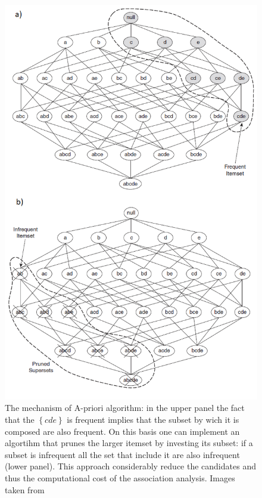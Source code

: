 \documentclass[12pt,%
               a4paper,%
               oneside,openany,%
               titlepage,%
               headinclude,footinclude,%
               BCOR5mm,%
               cleardoublepage=empty,%
               tablecaptionabove,%
               floatperchapter,
               ]{scrreprt}                 %
\begin{document}
\begin{figure}
\begin{center}
\includegraphics[width=\textwidth]{Figures/A-priori-ex.png}
\caption{The mechanism of A-priori algorithm: in the upper panel the fact that the $\left\lbrace cde \right\rbrace$ is frequent implies that the subset by wich it is composed are also frequent. On this basis one can implement an algortihm that prunes the larger itemset by investing its subset: if a subset is infrequent all the set that include it are also infrequent (lower panel). This approach considerably reduce the candidates and thus the computational cost of the association analysis. Images taken from \cite{tan2019introduction} }
\label{A-priori-ex}
\end{center}
\end{figure}
\end{document}
